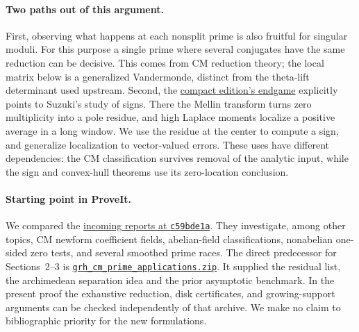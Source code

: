 \documentclass[11pt,letterpaper]{article}
\newcommand{\upfile}[2]{\href{https://github.com/lsernau/grh-lean/blob/72fead102f663d5c7a407964a13dc0cf9d977207/#1}{#2}}
\begin{document}
\paragraph{Two paths out of this argument.}
First, observing what happens at each nonsplit prime is also fruitful for singular moduli. For this purpose a single prime where several conjugates have the same reduction can be decisive. This comes from CM reduction theory; the local matrix below is a generalized Vandermonde, distinct from the theta-lift determinant used upstream.
Second, the \upfile{grh-compact/src/New/Endgame/OneSidedCriterion.lean}{compact edition's endgame} explicitly points to Suzuki's study of signs. There the Mellin transform turns zero multiplicity into a pole residue, and high Laplace moments localize a positive average in a long window. We use the residue at the center to compute a sign, and generalize localization to vector-valued errors. These uses have different dependencies: the CM classification survives removal of the analytic input, while the sign and convex-hull theorems use its zero-location conclusion.

\paragraph{Starting point in ProveIt.}
We compared the \href{https://github.com/VladimirReshetnikov/ProveIt/tree/c59bde1a0f52eee7a7a8dc6b326072f9b71f76a6/docs/incoming}{incoming reports at \texttt{c59bde1a}}. They investigate, among other topics, CM newform coefficient fields, abelian-field classifications, nonabelian one-sided zero tests, and several smoothed prime races. The direct predecessor for Sections~2--3 is \href{https://github.com/VladimirReshetnikov/ProveIt/blob/c59bde1a0f52eee7a7a8dc6b326072f9b71f76a6/docs/incoming/grh_cm_prime_applications.zip}{\texttt{grh\_cm\_prime\_applications.zip}}. It supplied the residual list, the archimedean separation idea and the prior asymptotic benchmark. In the present proof the exhaustive reduction, disk certificates, and growing-support arguments can be checked independently of that archive. We make no claim to bibliographic priority for the new formulations.






\end{document}
